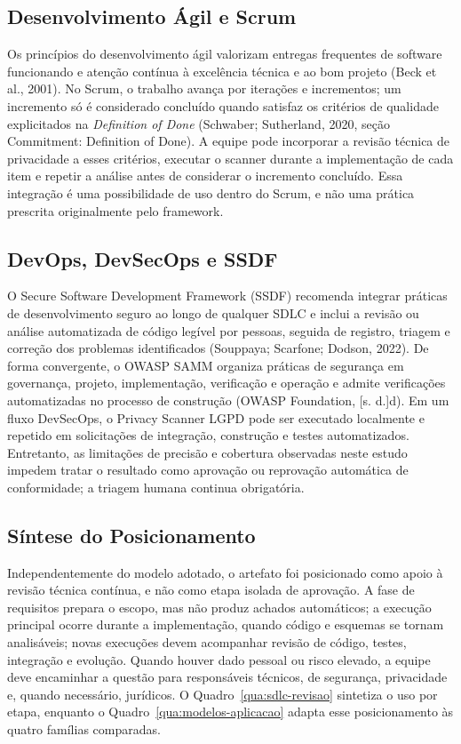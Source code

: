 \documentclass[12pt,a4paper,oneside]{report}
\begin{document}
\subsection{Desenvolvimento Ágil e Scrum}

Os princípios do desenvolvimento ágil valorizam entregas frequentes de software funcionando e atenção contínua à excelência técnica e ao bom projeto (Beck et al., 2001). No Scrum, o trabalho avança por iterações e incrementos; um incremento só é considerado concluído quando satisfaz os critérios de qualidade explicitados na \textit{Definition of Done} (Schwaber; Sutherland, 2020, seção Commitment: Definition of Done). A equipe pode incorporar a revisão técnica de privacidade a esses critérios, executar o scanner durante a implementação de cada item e repetir a análise antes de considerar o incremento concluído. Essa integração é uma possibilidade de uso dentro do Scrum, e não uma prática prescrita originalmente pelo framework.

\subsection{DevOps, DevSecOps e SSDF}

O Secure Software Development Framework (SSDF) recomenda integrar práticas de desenvolvimento seguro ao longo de qualquer SDLC e inclui a revisão ou análise automatizada de código legível por pessoas, seguida de registro, triagem e correção dos problemas identificados (Souppaya; Scarfone; Dodson, 2022). De forma convergente, o OWASP SAMM organiza práticas de segurança em governança, projeto, implementação, verificação e operação e admite verificações automatizadas no processo de construção (OWASP Foundation, [s. d.]d). Em um fluxo DevSecOps, o Privacy Scanner LGPD pode ser executado localmente e repetido em solicitações de integração, construção e testes automatizados. Entretanto, as limitações de precisão e cobertura observadas neste estudo impedem tratar o resultado como aprovação ou reprovação automática de conformidade; a triagem humana continua obrigatória.

\subsection{Síntese do Posicionamento}

Independentemente do modelo adotado, o artefato foi posicionado como apoio à revisão técnica contínua, e não como etapa isolada de aprovação. A fase de requisitos prepara o escopo, mas não produz achados automáticos; a execução principal ocorre durante a implementação, quando código e esquemas se tornam analisáveis; novas execuções devem acompanhar revisão de código, testes, integração e evolução. Quando houver dado pessoal ou risco elevado, a equipe deve encaminhar a questão para responsáveis técnicos, de segurança, privacidade e, quando necessário, jurídicos. O Quadro~\ref{qua:sdlc-revisao} sintetiza o uso por etapa, enquanto o Quadro~\ref{qua:modelos-aplicacao} adapta esse posicionamento às quatro famílias comparadas.
\end{document}
